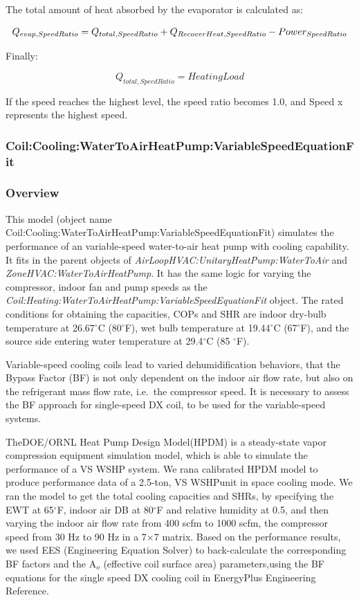 The total amount of heat absorbed by the evaporator is calculated as:

\begin{equation}
{Q_{evap,SpeedRatio}} = {Q_{total,SpeedRatio}} + {\rm{}}{Q_{RecoverHeat,SpeedRatio}} - Powe{r_{SpeedRatio}}
\end{equation}

Finally:

\begin{equation}
{Q_{total,SpeedRatio}} = HeatingLoad
\end{equation}

If the speed reaches the highest level, the speed ratio becomes 1.0, and Speed x represents the highest speed.

\subsubsection{Coil:Cooling:WaterToAirHeatPump:VariableSpeedEquationFit}\label{coilcoolingwatertoairheatpumpvariablespeedequationfit}

\subsubsection{Overview}\label{overview-14}

This model (object name Coil:Cooling:WaterToAirHeatPump:VariableSpeedEquationFit) simulates the performance of an variable-speed water-to-air heat pump with cooling capability. It fits in the parent objects of \emph{AirLoopHVAC:UnitaryHeatPump:WaterToAir} and \emph{ZoneHVAC:WaterToAirHeatPump}. It has the same logic for varying the compressor, indoor fan and pump speeds as the \emph{Coil:Heating:WaterToAirHeatPump:VariableSpeedEquationFit} object. The rated conditions for obtaining the capacities, COPs and SHR are indoor dry-bulb temperature at 26.67\(^{\circ}\)C (80\(^{\circ}\)F), wet bulb temperature at 19.44\(^{\circ}\)C (67\(^{\circ}\)F), and the source side entering water temperature at 29.4\(^{\circ}\)C (85 \(^{\circ}\)F).

Variable-speed cooling coils lead to varied dehumidification behaviors, that the Bypass Factor (BF) is not only dependent on the indoor air flow rate, but also on the refrigerant mass flow rate, i.e.~the compressor speed. It is necessary to assess the BF approach for single-speed DX coil, to be used for the variable-speed systems.

TheDOE/ORNL Heat Pump Design Model(HPDM) is a steady-state vapor compression equipment simulation model, which is able to simulate the performance of a VS WSHP system. We rana calibrated HPDM model to produce performance data of a 2.5-ton, VS WSHPunit in space cooling mode. We ran the model to get the total cooling capacities and SHRs, by specifying the EWT at 65\(^{\circ}\)F, indoor air DB at 80\(^{\circ}\)F and relative humidity at 0.5, and then varying the indoor air flow rate from 400 scfm to 1000 scfm, the compressor speed from 30 Hz to 90 Hz in a 7×7 matrix. Based on the performance results, we used EES (Engineering Equation Solver) to back-calculate the corresponding BF factors and the A\(_{o}\) (effective coil surface area) parameters,using the BF equations for the single speed DX cooling coil in EnergyPlus Engineering Reference.

